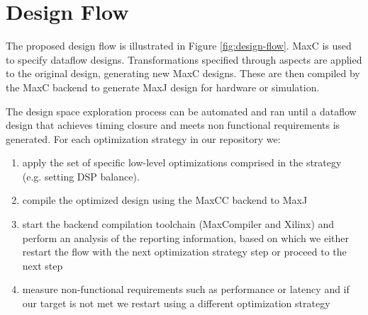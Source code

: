 \section{Design Flow}

The proposed design flow is illustrated in Figure
\ref{fig:design-flow}. MaxC is used to specify dataflow
designs. Transformations specified through aspects are applied to the
original design, generating new MaxC designs. These are then compiled
by the MaxC backend to generate MaxJ design for hardware or
simulation.

The design space exploration process can be automated and ran until a
dataflow design that achieves timing closure and meets non functional
requirements is generated.  For each optimization strategy in our
repository we:

\begin{enumerate}

\item apply the set of specific low-level optimizations comprised in
  the strategy (e.g. setting DSP balance).

\item compile the optimized design using the MaxCC backend to MaxJ

\item start the backend compilation toolchain (MaxCompiler
  and Xilinx) and perform an analysis of the reporting information,
  based on which we either restart the flow with the next optimization
  strategy step or proceed to the next step

\item measure non-functional requirements such as performance or
  latency and if our target is not met we restart using a different
  optimization strategy

\end{enumerate}
